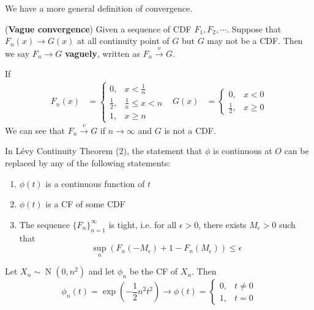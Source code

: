 \documentclass{huhtakm-template-book}
\DeclareMathOperator{\N}{N}
\begin{document}
We have a more general definition of convergence.
\begin{defn}(\textbf{Vague convergence})
	Given a sequence of CDF $F_{1},F_{2},\cdots$. Suppose that $F_{n}(x)\to G(x)$ at all continuity point of $G$ but $G$ may not be a CDF. Then we say $F_{n}\to G$ \textbf{vaguely}, written as $F_{n}\xrightarrow{v}G$.
\end{defn}
\begin{eg}
	If
	\begin{align*}
		F_{n}(x)&=\begin{cases}
			0, &x<\frac{1}{n}\\
			\frac{1}{2}, &\frac{1}{n}\leq x<n\\
			1, &x\geq n
		\end{cases} & G(x)&=\begin{cases}
			0, &x<0\\
			\frac{1}{2}, &x\geq 0
		\end{cases}
	\end{align*}
	We can see that $F_{n}\xrightarrow{v}G$ if $n\to\infty$ and $G$ is not a CDF.
\end{eg}
\begin{rem}
	In L\'evy Continuity Theorem (2), the statement that $\phi$ is continuous at $O$ can be replaced by any of the following statements:
	\begin{enumerate}
		\item $\phi(t)$ is a continuous function of $t$
		\item $\phi(t)$ is a CF of some CDF
		\item The sequence $\{F_{n}\}_{n=1}^{\infty}$ is tight, i.e. for all $\epsilon>0$, there exists $M_{\epsilon}>0$ such that
		\begin{equation*}
			\sup_{n}(F_{n}(-M_{\epsilon})+1-F_{n}(M_{\epsilon}))\leq\epsilon
		\end{equation*}
	\end{enumerate}
\end{rem}
\begin{eg}
	Let $X_{n}\sim\N(0,n^{2})$ and let $\phi_{n}$ be the CF of $X_{n}$. Then
	\begin{equation*}
		\phi_{n}(t)=\exp\left(-\frac{1}{2}n^{2}t^{2}\right)\to\phi(t)=\begin{cases}
			0, &t\neq 0\\
			1, &t=0
		\end{cases}
	\end{equation*}
\end{eg}
\end{document}
